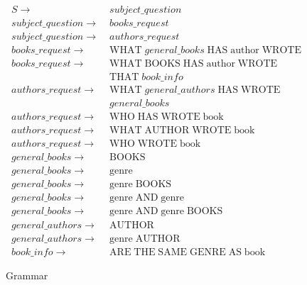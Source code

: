 \documentclass[11pt]{article}
\begin{document}
{\begin{figure}[h!]
\setcounter{equation}{0}
\begin{align}
S \rightarrow\; & subject\_question \label{gram:subj}\\
subject\_question \rightarrow\; & books\_request \label{gram:books}\\
subject\_question \rightarrow\; & authors\_request \label{gram:auths}\\
books\_request \rightarrow\; &
\text{WHAT} \; general\_books \; \text{HAS} \; \text{author} \; \text{WROTE} 
\label{gram:sim_books}\\
books\_request \rightarrow\; & \label{gram:comp_books}
\text{WHAT} \; \text{BOOKS} \; \text{HAS} \; \text{author} \; \text{WROTE}\\
&\text{THAT} \; book\_info \nonumber\\
authors\_request \rightarrow\; &
\text{WHAT} \; general\_authors \; \text{HAS} \; \text{WROTE} \\
&general\_books \nonumber \label{gram:comp_auths}\\
authors\_request \rightarrow\; &
\text{WHO} \; \text{HAS} \; \text{WROTE} \; \text{book}\\
authors\_request \rightarrow\; &
\text{WHAT} \; \text{AUTHOR} \; \text{WROTE} \; \text{book}\\
authors\_request \rightarrow\; &
\text{WHO} \; \text{WROTE} \; \text{book} \label{gram:who_wrote}\\
general\_books \rightarrow\; & \text{BOOKS} \label{gram:simp_gen_books}\\
general\_books \rightarrow\; & \text{genre}\\
general\_books \rightarrow\; & \text{genre} \; \text{BOOKS} \label{gram:comp_gen_books}\\
general\_books \rightarrow\; & 
\text{genre} \; \text{AND} \; \text{genre}\\
general\_books \rightarrow\; & 
\text{genre} \; \text{AND} \; \text{genre} \; \text{BOOKS}\\
general\_authors \rightarrow\; & \text{AUTHOR} \label{gram:simp_gen_auths}\\
general\_authors \rightarrow\; & \text{genre} \; \text{AUTHOR} \label{gram:comp_gen_auths}\\
book\_info \rightarrow\; & \text{ARE} \; \text{THE} \; \text{SAME} \; \text{GENRE} \;
\text{AS} \; \text{book} \label{gram:book_info}
\end{align}

\caption{Grammar}
\label{fig:grammar}
\end{figure}

}
\end{document}
